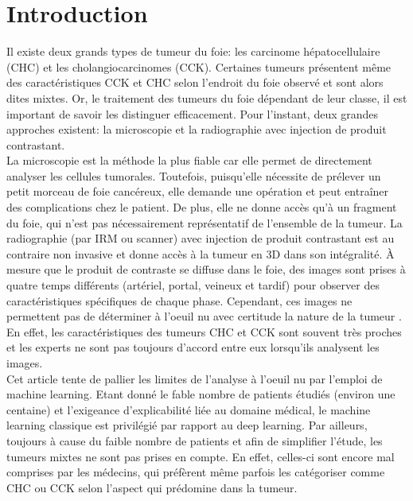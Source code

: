 \documentclass[preprint,12pt]{elsarticle}
\begin{document}

\section{Introduction}
\indent Il existe deux grands types de tumeur du foie: les carcinome hépatocellulaire (CHC) et les cholangiocarcinomes (CCK). Certaines tumeurs présentent même des caractéristiques CCK et CHC selon l'endroit du foie observé et sont alors dites mixtes. Or, le traitement des tumeurs du foie dépendant de leur classe, il est important de savoir les distinguer efficacement. Pour l'instant, deux grandes approches existent: la microscopie et la radiographie avec injection de produit contrastant.\\
\indent La microscopie est la méthode la plus fiable car elle permet de directement analyser les cellules tumorales. Toutefois, puisqu'elle nécessite de prélever un petit morceau de foie cancéreux, elle demande une opération et peut entraîner des complications chez le patient. De plus, elle ne donne accès qu'à un fragment du foie, qui n'est pas nécessairement représentatif de l'ensemble de la tumeur. La radiographie (par IRM ou scanner) avec injection de produit contrastant est au contraire non invasive et donne accès à la tumeur en 3D dans son intégralité. À mesure que le produit de contraste se diffuse dans le foie, des images sont prises à quatre temps différents (artériel, portal, veineux et tardif) pour observer des caractéristiques spécifiques de chaque phase. Cependant, ces images ne permettent pas de déterminer à l'oeuil nu avec certitude la nature de la tumeur \cite{desaccord}. En effet, les caractéristiques des tumeurs CHC et CCK sont souvent très proches et les experts ne sont pas toujours d'accord entre eux lorsqu'ils analysent les images.\\
\indent Cet article tente de pallier les limites de l'analyse à l'oeuil nu par l'emploi de machine learning. Etant donné le fable nombre de patients étudiés (environ une centaine) et l'exigeance d'explicabilité liée au domaine médical, le machine learning classique est privilégié par rapport au deep learning. Par ailleurs, toujours à cause du faible nombre de patients et afin de simplifier l'étude, les tumeurs mixtes ne sont pas prises en compte. En effet, celles-ci sont encore mal comprises par les médecins, qui préfèrent même parfois les catégoriser comme CHC ou CCK selon l'aspect qui prédomine dans la tumeur.\\
\end{document}
